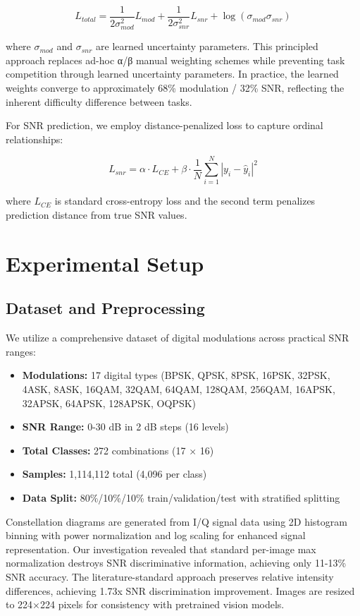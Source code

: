\documentclass{ELSP}
\begin{document}
{{\begin{equation}
L_{total} = \frac{1}{2\sigma_{mod}^2} L_{mod} + \frac{1}{2\sigma_{snr}^2} L_{snr} + \log(\sigma_{mod}\sigma_{snr})
\end{equation}

where $\sigma_{mod}$ and $\sigma_{snr}$ are learned uncertainty parameters. This principled approach replaces ad-hoc α/β manual weighting schemes while preventing task competition through learned uncertainty parameters. In practice, the learned weights converge to approximately 68\% modulation / 32\% SNR, reflecting the inherent difficulty difference between tasks.

For SNR prediction, we employ distance-penalized loss to capture ordinal relationships:

\begin{equation}
L_{snr} = \alpha \cdot L_{CE} + \beta \cdot \frac{1}{N} \sum_{i=1}^{N} |y_i - \hat{y}_i|^2
\end{equation}

where $L_{CE}$ is standard cross-entropy loss and the second term penalizes prediction distance from true SNR values.

\section{Experimental Setup}

\subsection{Dataset and Preprocessing}

We utilize a comprehensive dataset of digital modulations across practical SNR ranges:
\begin{itemize}
    \item \textbf{Modulations:} 17 digital types (BPSK, QPSK, 8PSK, 16PSK, 32PSK, 4ASK, 8ASK, 16QAM, 32QAM, 64QAM, 128QAM, 256QAM, 16APSK, 32APSK, 64APSK, 128APSK, OQPSK)
    \item \textbf{SNR Range:} 0-30 dB in 2 dB steps (16 levels)
    \item \textbf{Total Classes:} 272 combinations (17 × 16)
    \item \textbf{Samples:} 1,114,112 total (4,096 per class)
    \item \textbf{Data Split:} 80\%/10\%/10\% train/validation/test with stratified splitting
\end{itemize}

Constellation diagrams are generated from I/Q signal data using 2D histogram binning with power normalization and log scaling for enhanced signal representation. Our investigation revealed that standard per-image max normalization destroys SNR discriminative information, achieving only 11-13\% SNR accuracy. The literature-standard approach preserves relative intensity differences, achieving 1.73x SNR discrimination improvement. Images are resized to 224×224 pixels for consistency with pretrained vision models.

}}
\end{document}
